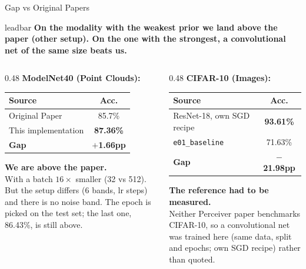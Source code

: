 \documentclass[aspectratio=169,11pt]{beamer}
\newcommand{\lead}[1]{%
  \begin{beamercolorbox}[wd=\textwidth,sep=5pt,center]{leadbar}%
    \small\bfseries #1%
  \end{beamercolorbox}\vspace{0.6em}}
\begin{document}
\begin{frame}[shrink=28]{Gap vs Original Papers}
  \lead{On the modality with the weakest prior we land above the paper (other setup). On the one with the strongest, a convolutional net of the same size beats us.}
  \begin{columns}[T]
    \begin{column}{0.48\textwidth}
      \textbf{ModelNet40 (Point Clouds):}
      \begin{table}
        \centering\small
        \begin{tabular}{lc}
          \toprule
          \textbf{Source} & \textbf{Acc.} \\
          \midrule
          Original Paper & 85.7\% \\
          This implementation & \textbf{87.36\%} \\
          \midrule
          \textbf{Gap} & \textcolor{AccentGreen}{\textbf{$+$1.66pp}} \\
          \bottomrule
        \end{tabular}
      \end{table}

      \vspace{0.3em}
      \textbf{We are above the paper.}\\
      With a batch $16\times$ smaller (32 vs 512). But the setup differs (6 bands, lr steps) and there is no noise band. The epoch is picked on the test set; the last one, 86.43\%, is still above.
    \end{column}
    \begin{column}{0.48\textwidth}
      \textbf{CIFAR-10 (Images):}
      \begin{table}
        \centering\small
        \begin{tabular}{lc}
          \toprule
          \textbf{Source} & \textbf{Acc.} \\
          \midrule
          ResNet-18, own SGD recipe & \textbf{93.61\%} \\
          \texttt{e01\_baseline} & 71.63\% \\
          \midrule
          \textbf{Gap} & \textcolor{AccentRed}{\textbf{$-$21.98pp}} \\
          \bottomrule
        \end{tabular}
      \end{table}

      \vspace{0.3em}
      \textbf{The reference had to be measured.}\\
      Neither Perceiver paper benchmarks CIFAR-10, so a convolutional net was trained here (same data, split and epochs; own SGD recipe) rather than quoted.
    \end{column}
  \end{columns}


\end{frame}
\end{document}
